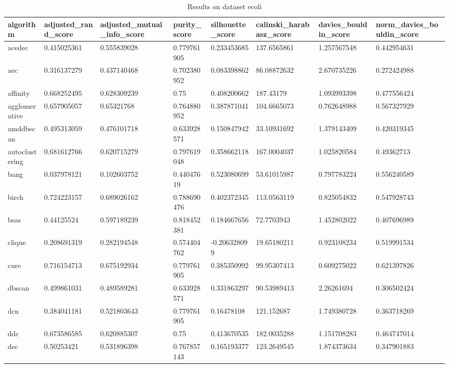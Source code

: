 \begin{table}[H]
\centering
\caption{Results on dataset ecoli}
\label{tab:params:ecoli}
\begin{tabular}{|l|l|l|l|l|l|l|l|}
\hline
algorithm & adjusted\_rand\_score & adjusted\_mutual\_info\_score & purity\_score & silhouette\_score & calinski\_harabasz\_score & davies\_bouldin\_score & norm\_davies\_bouldin\_score \\
\hline
acedec & 0.415025361 & 0.555839028 & 0.779761905 & 0.233453685 & 137.6565861 & 1.257567548 & 0.442954631 \\
\hline
aec & 0.316137279 & 0.437140468 & 0.702380952 & 0.083398862 & 86.08872632 & 2.670735226 & 0.272424988 \\
\hline
affinity & 0.668252495 & 0.628309239 & 0.75 & 0.408200662 & 187.43179 & 1.093993398 & 0.477556424 \\
\hline
agglomerative & 0.657905057 & 0.65321768 & 0.764880952 & 0.387871041 & 104.6665073 & 0.762648988 & 0.567327929 \\
\hline
amddbscan & 0.495313059 & 0.476101718 & 0.633928571 & 0.150847942 & 33.10931692 & 1.379143409 & 0.420319345 \\
\hline
autoclustering & 0.681612766 & 0.620715279 & 0.797619048 & 0.358662118 & 167.0004037 & 1.025820584 & 0.49362713 \\
\hline
bang & 0.037978121 & 0.102603752 & 0.44047619 & 0.523080699 & 53.61015987 & 0.797783224 & 0.556240589 \\
\hline
birch & 0.724223157 & 0.689026162 & 0.788690476 & 0.402372345 & 113.0563119 & 0.825054832 & 0.547928743 \\
\hline
bsas & 0.44125524 & 0.597189239 & 0.818452381 & 0.184667656 & 72.7703943 & 1.452802022 & 0.407696989 \\
\hline
clique & 0.208691319 & 0.282194548 & 0.574404762 & -0.206328099 & 19.65180211 & 0.923108234 & 0.519991534 \\
\hline
cure & 0.716154713 & 0.675192934 & 0.779761905 & 0.385350992 & 99.95307413 & 0.609275022 & 0.621397826 \\
\hline
dbscan & 0.499861031 & 0.489589281 & 0.633928571 & 0.331863297 & 90.53989413 & 2.26261694 & 0.306502424 \\
\hline
dcn & 0.384041181 & 0.521803643 & 0.779761905 & 0.16478108 & 121.152687 & 1.749380728 & 0.363718269 \\
\hline
ddc & 0.673586585 & 0.620885307 & 0.75 & 0.413670535 & 182.0035288 & 1.151708283 & 0.464747014 \\
\hline
dec & 0.50253421 & 0.531896398 & 0.767857143 & 0.165193377 & 123.2649545 & 1.874373634 & 0.347901883 \\

\end{tabular}
\end{table}
